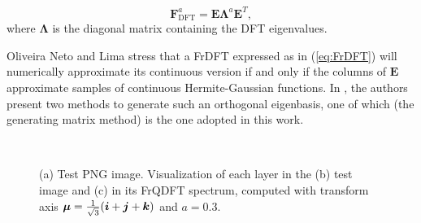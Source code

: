 \begin{equation}
\label{eq:FrDFT}
\mathbf{F}_{\text{DFT}}^a = \mathbf{E} \mathbf{\Lambda}^a \mathbf{E}^T,
\end{equation}
where $ \mathbf{\Lambda} $ is the diagonal matrix containing the DFT eigenvalues.

Oliveira Neto and Lima \cite{de2017discrete} stress that a FrDFT expressed as in (\ref{eq:FrDFT}) will numerically approximate its continuous version if and only if the columns of $ \mathbf{E} $ approximate samples of continuous Hermite-Gaussian functions. In \cite{de2017discrete}, the authors present two methods to generate such an orthogonal eigenbasis, one of which (the generating matrix method) is the one adopted in this work.

\begin{figure}
\centering
{}~
~
~
\caption{(a) Test PNG image. Visualization of each layer in the (b) test image and (c) in its FrQDFT spectrum, computed with transform axis $ \boldsymbol{\mu} = \frac{1}{\sqrt{3}}(\boldsymbol{i} + \boldsymbol{j} + \boldsymbol{k}) $ and $ a=0{.}3 $.}
\end{figure}

